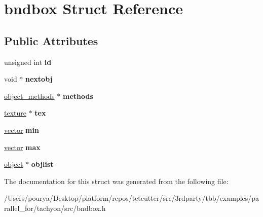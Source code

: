 \hypertarget{structbndbox}{}\section{bndbox Struct Reference}
\label{structbndbox}
\subsection*{Public Attributes}
\begin{DoxyCompactItemize}
\item 
\hypertarget{structbndbox_ae4489ba2016a1a0970617bfa6cbf2a5c}{}unsigned int {\bfseries id}\label{structbndbox_ae4489ba2016a1a0970617bfa6cbf2a5c}

\item 
\hypertarget{structbndbox_ada254a61574cfe41805a95827794806a}{}void $\ast$ {\bfseries nextobj}\label{structbndbox_ada254a61574cfe41805a95827794806a}

\item 
\hypertarget{structbndbox_a14fb84761b66d06fe7f19b1ad013ac68}{}\hyperlink{structobject__methods}{object\+\_\+methods} $\ast$ {\bfseries methods}\label{structbndbox_a14fb84761b66d06fe7f19b1ad013ac68}

\item 
\hypertarget{structbndbox_ad05cb51e6348b54e7dbbf7e93d113857}{}\hyperlink{structtexture}{texture} $\ast$ {\bfseries tex}\label{structbndbox_ad05cb51e6348b54e7dbbf7e93d113857}

\item 
\hypertarget{structbndbox_a477ab6bb5dd4534e1a7d0c30273b4de9}{}\hyperlink{structvector}{vector} {\bfseries min}\label{structbndbox_a477ab6bb5dd4534e1a7d0c30273b4de9}

\item 
\hypertarget{structbndbox_ab6628b557f46c30e11e5605068e6c784}{}\hyperlink{structvector}{vector} {\bfseries max}\label{structbndbox_ab6628b557f46c30e11e5605068e6c784}

\item 
\hypertarget{structbndbox_af4eb25b389b2d8aa75be6ab578a64677}{}\hyperlink{structobject}{object} $\ast$ {\bfseries objlist}\label{structbndbox_af4eb25b389b2d8aa75be6ab578a64677}

\end{DoxyCompactItemize}


The documentation for this struct was generated from the following file\+:\begin{DoxyCompactItemize}
\item 
/\+Users/pourya/\+Desktop/platform/repos/tetcutter/src/3rdparty/tbb/examples/parallel\+\_\+for/tachyon/src/bndbox.\+h\end{DoxyCompactItemize}
